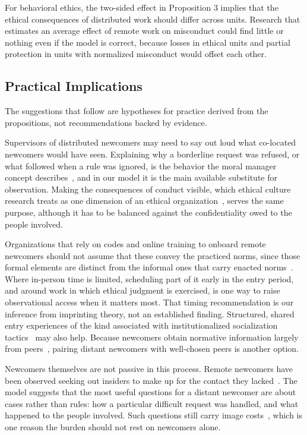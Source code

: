 For behavioral ethics, the two-sided effect in Proposition 3 implies that the ethical consequences of distributed work should differ across units. Research that estimates an average effect of remote work on misconduct could find little or nothing even if the model is correct, because losses in ethical units and partial protection in units with normalized misconduct would offset each other.

\subsection{Practical Implications}

The suggestions that follow are hypotheses for practice derived from the propositions, not recommendations backed by evidence.

Supervisors of distributed newcomers may need to say out loud what co-located newcomers would have seen. Explaining why a borderline request was refused, or what followed when a rule was ignored, is the behavior the moral manager concept describes~\citep{trevino2000moral}, and in our model it is the main available substitute for observation. Making the consequences of conduct visible, which ethical culture research treats as one dimension of an ethical organization~\citep{kaptein2008developing}, serves the same purpose, although it has to be balanced against the confidentiality owed to the people involved.

Organizations that rely on codes and online training to onboard remote newcomers should not assume that these convey the practiced norms, since those formal elements are distinct from the informal ones that carry enacted norms~\citep{tenbrunsel2003building}. Where in-person time is limited, scheduling part of it early in the entry period, and around work in which ethical judgment is exercised, is one way to raise observational access when it matters most. That timing recommendation is our inference from imprinting theory, not an established finding. Structured, shared entry experiences of the kind associated with institutionalized socialization tactics~\citep{ashforth1996socialization} may also help. Because newcomers obtain normative information largely from peers~\citep{morrison1993newcomer}, pairing distant newcomers with well-chosen peers is another option.

Newcomers themselves are not passive in this process. Remote newcomers have been observed seeking out insiders to make up for the contact they lacked~\citep{paik2026membership}. The model suggests that the most useful questions for a distant newcomer are about cases rather than rules: how a particular difficult request was handled, and what happened to the people involved. Such questions still carry image costs~\citep{ashford2003reflections}, which is one reason the burden should not rest on newcomers alone.


